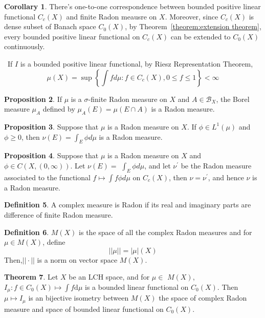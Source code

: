 \documentclass[12pt,a4paper]{book}
\newenvironment{prooff}{{\noindent\it\textcolor{cyan!40!black}{Proof}:}\,}{\par}
\theoremstyle{definition}
\newtheorem{defn}{Definition}[section]
\newtheorem{coro}[defn]{Corollary}
\newtheorem{theo}[defn]{Theorem}
\newtheorem{prop}[defn]{Proposition}
\begin{document}
\begin{coro}
    There's one-to-one correspondence between bounded positive linear functional $C_c(X)$ and finite Radon meausre on $X$.
    Moreover, since $C_c(X)$ is dense subset of Banach space $C_0(X)$,
    by Theorem~\ref{theorem:extension theorem},
    every bounded positive linear functional on $C_c(X)$ can be extended to $C_0(X)$ continuously.
\end{coro}
\begin{prooff}
    If $I$ is a bounded positive linear functional, by  Riesz Representation Theorem,
    \begin{equation*}
        \mu(X)=\sup \left\{\int f d \mu: f \in C_c(X), 0 \leq f \leq 1\right\}<\infty
    \end{equation*}
\end{prooff}
\begin{prop}
    If $\mu$ is a $\sigma$-finite Radon measure on $X$ and $A \in \mathcal{B}_X$, the Borel measure $\mu_A$ defined by $\mu_A(E)=\mu(E \cap A)$ is a Radon measure. 
\end{prop}
\begin{prop}
    Suppose that $\mu$ is a Radon measure on $X$. If $\phi \in L^1(\mu)$ and $\phi \geq 0$, then $\nu(E)=\int_E \phi d \mu$ is a Radon measure. 
\end{prop}
\begin{prop}
    Suppose that $\mu$ is a Radon measure on $X$ and $\phi \in C(X,(0, \infty))$. Let $\nu(E)=$ $\int_E \phi d \mu$, and let $\nu^{\prime}$ be the Radon measure associated to the functional $f \mapsto \int f \phi d \mu$ on $C_c(X)$, then $\nu=\nu^{\prime}$, and hence $\nu$ is a Radon measure.
    \label{proposition: integration Radon measure}
\end{prop}
\begin{defn}
    A complex measure is Radon if its real and imaginary parts are difference of finite Radon measure.
\end{defn}
\begin{defn}
    $M(X)$ is the space of all the complex Radon measures and for $\mu\in M(X)$, define
    \begin{equation*}
        ||\mu||=|\mu|(X)
    \end{equation*}
    Then,$||\cdot||$ is a norm on vector space $M(X)$.
\end{defn}
\begin{theo}
    Let $X$ be an LCH space, and for $\mu \in$ $M(X)$, $I_\mu: f\in C_0(X)\mapsto \int f\text{d}\mu $ is a bounded linear functional on $C_0(X)$. Then
    $\mu\mapsto I_{\mu}$ is an bijective isometry between $M(X)$ the space of complex Radon measure and space of
    bounded linear functional on $C_0(X)$.
\end{theo}
\end{document}
